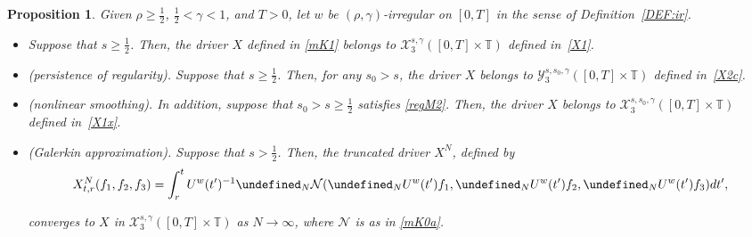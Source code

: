 \documentclass[letterpaper, 11pt,  reqno]{amsart}
\newtheorem{proposition}[theorem]{Proposition}
\newcommand{\1}{\hspace{0.5mm}\text{I}\hspace{0.5mm}}
\newcommand{\noi}{\noindent}
\newcommand{\T}{\mathbb{T}}
\let\P= \undefined
\newcommand{\P}{\mathbf{P}}
\newcommand{\g}{\gamma}
\newcommand{\NN}{\mathcal{N}}
\newcommand{\cX}{\mathcal{X}}
\newcommand{\cY}{\mathcal{Y}}
\newcommand{\uw}{U^w}
\numberwithin{equation}{section}
\numberwithin{theorem}{section}
\begin{document}
\begin{proposition}\label{PROP:mkdv1}
Given $\rho \ge\frac 12$,  $\frac 12 < \g < 1$, and $T> 0$, 
let  $w$ be $(\rho,\g)$-irregular on $[0, T]$ in the sense of Definition~\ref{DEF:ir}.


\smallskip

\begin{itemize}
\item[(i)]
Suppose that $s \ge \frac 12$. 
Then, 
the driver $X$ defined in \eqref{mK1}
belongs to $ \cX^{s, \g}_3([0, T]\times \T)$
defined in~\eqref{X1}.

\smallskip
\item[(ii)] \textup{(persistence of regularity).}
Suppose that $s \ge \frac 12$. 
Then, 
for any $s_0 > s$, 
the driver $X$ 
belongs to 
$\cY^{s, s_0, \g}_{3}([0, T]\times \T)$
defined in~\eqref{X2c}.



\smallskip
\item[(iii)]
\textup{(nonlinear smoothing).}
In addition, suppose that $s_0 > s \ge \frac 12$ satisfies
\eqref{regM2}.
Then, 
the driver $X$ 
belongs to 
$\cX^{s, s_0, \g}_{3}([0, T]\times \T)$
defined in~\eqref{X1x}.



\smallskip
\item[(iv)]
\textup{(Galerkin approximation).}
Suppose that $s > \frac 12$.
Then, 
the truncated driver $X^N$, defined by 
 \begin{align}
X_{t,r}^N(f_1,f_2, f_3)=\int_r^t  \uw(t')^{-1}
\P_N \NN( \P_N \uw(t')  f_1 ,\P_N  \uw(t') f_2, \P_N  \uw(t') f_3) dt',
\label{XN2}
\end{align}


\noi
 converges
to  $X$ 
in  $ \cX^{s, \g}_3([0, T]\times \T)$ as $N \to \infty$, 
where $\NN$ is as in \eqref{mK0a}.


\end{itemize}




\end{proposition}
\end{document}
